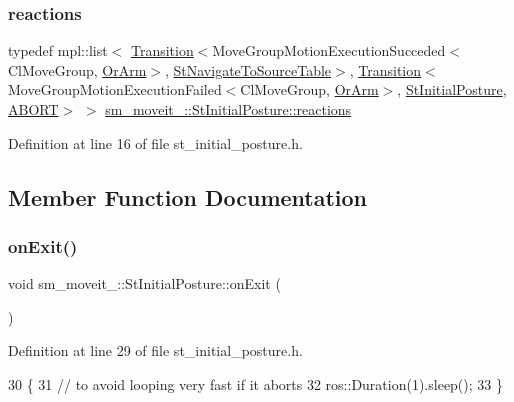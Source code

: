 \subsubsection{\texorpdfstring{reactions}{reactions}}
{\footnotesize\ttfamily typedef mpl\+::list$<$ \hyperlink{classsmacc_1_1Transition}{Transition}$<$Move\+Group\+Motion\+Execution\+Succeded$<$Cl\+Move\+Group, \hyperlink{classsm__moveit__4_1_1OrArm}{Or\+Arm}$>$, \hyperlink{structsm__moveit__4_1_1StNavigateToSourceTable}{St\+Navigate\+To\+Source\+Table}$>$, \hyperlink{classsmacc_1_1Transition}{Transition}$<$Move\+Group\+Motion\+Execution\+Failed$<$Cl\+Move\+Group, \hyperlink{classsm__moveit__4_1_1OrArm}{Or\+Arm}$>$, \hyperlink{structsm__moveit__4_1_1StInitialPosture}{St\+Initial\+Posture}, \hyperlink{structsmacc_1_1default__transition__tags_1_1ABORT}{A\+B\+O\+RT}$>$ $>$ \hyperlink{structsm__moveit__4_1_1StInitialPosture_aba6b4f6994263b0b57c50986b9db3497}{sm\+\_\+moveit\+\_\+::\+St\+Initial\+Posture\+::reactions}}



Definition at line 16 of file st\+\_\+initial\+\_\+posture.\+h.



\subsection{Member Function Documentation}
\mbox{\label{structsm__moveit__4_1_1StInitialPosture_a13d072d68463d6aeafb5e07dbec2aaa2}} 
\subsubsection{\texorpdfstring{on\+Exit()}{onExit()}}
{\footnotesize\ttfamily void sm\+\_\+moveit\+\_\+::\+St\+Initial\+Posture\+::on\+Exit (\begin{DoxyParamCaption}{ }\end{DoxyParamCaption})\hspace{0.3cm}{\ttfamily [inline]}}



Definition at line 29 of file st\+\_\+initial\+\_\+posture.\+h.


\begin{DoxyCode}
30     \{
31         \textcolor{comment}{// to avoid looping very fast if it aborts}
32         ros::Duration(1).sleep();
33     \}
\end{DoxyCode}
\mbox{\label{structsm__moveit__4_1_1StInitialPosture_a0ba0a6fc206c11bfdd8d64594290b386}} 
